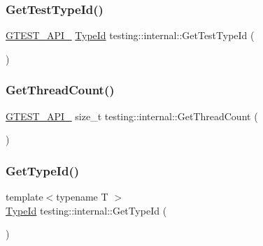 \subsubsection{\texorpdfstring{Get\+Test\+Type\+Id()}{GetTestTypeId()}}
{\footnotesize\ttfamily \hyperlink{gtest-port_8h_aa73be6f0ba4a7456180a94904ce17790}{G\+T\+E\+S\+T\+\_\+\+A\+P\+I\+\_\+} \hyperlink{namespacetesting_1_1internal_ab1114197d3c657d8b7f8e0c5caa12d00}{Type\+Id} testing\+::internal\+::\+Get\+Test\+Type\+Id (\begin{DoxyParamCaption}{ }\end{DoxyParamCaption})}

\mbox{\label{namespacetesting_1_1internal_a8cbd8bf820517923d7f3c4477b3af5fa}} 
\subsubsection{\texorpdfstring{Get\+Thread\+Count()}{GetThreadCount()}}
{\footnotesize\ttfamily \hyperlink{gtest-port_8h_aa73be6f0ba4a7456180a94904ce17790}{G\+T\+E\+S\+T\+\_\+\+A\+P\+I\+\_\+} size\+\_\+t testing\+::internal\+::\+Get\+Thread\+Count (\begin{DoxyParamCaption}{ }\end{DoxyParamCaption})}

\mbox{\label{namespacetesting_1_1internal_a6b108e56fdc68ea937ffb3759fb55ab0}} 
\subsubsection{\texorpdfstring{Get\+Type\+Id()}{GetTypeId()}}
{\footnotesize\ttfamily template$<$typename T $>$ \\
\hyperlink{namespacetesting_1_1internal_ab1114197d3c657d8b7f8e0c5caa12d00}{Type\+Id} testing\+::internal\+::\+Get\+Type\+Id (\begin{DoxyParamCaption}{ }\end{DoxyParamCaption})}

\mbox{\label{namespacetesting_1_1internal_a635606b4731f843c86ec8ca51cab83a1}} 
